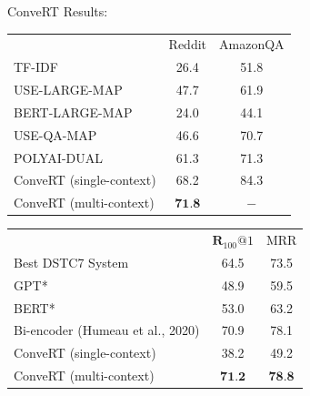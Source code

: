 \documentclass{beamer}
\begin{document}
\begin{frame}{ConveRT}
Results:
\begin{center}\footnotesize
\begin{tabular}{lcc} 
\hline & Reddit & AmazonQA \\
\cline { 2 - 3 } TF-IDF & 26.4 & 51.8 \\
USE-LARGE-MAP & 47.7 & 61.9 \\
BERT-LARGE-MAP & 24.0 & 44.1 \\
USE-QA-MAP & 46.6 & 70.7 \\
POLYAI-DUAL & 61.3 & 71.3 \\
\hline ConveRT (single-context) & 68.2 & 84.3 \\
ConveRT (multi-context) & $\mathbf{7 1 . 8}$ & $-$ \\
\hline
\end{tabular}
\end{center}

\begin{center}\footnotesize

    \begin{tabular}{lcc}
\hline & $\mathbf{R}_{100} @ 1$ & MRR \\
\cline { 2 - 3 } Best DSTC7 System & 64.5 & 73.5 \\
GPT* & 48.9 & 59.5 \\
BERT* & 53.0 & 63.2 \\
Bi-encoder (Humeau et al., 2020) & 70.9 & 78.1 \\
\hline ConveRT (single-context) & 38.2 & 49.2 \\
ConveRT (multi-context) & $\mathbf{7 1 . 2}$ & $\mathbf{7 8 . 8}$ \\
\hline
\end{tabular}
\end{center}

\end{frame}
\end{document}
